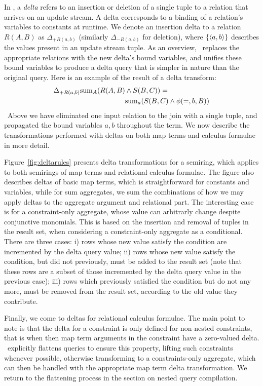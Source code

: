 In \compiler, a \textit{delta} refers to an insertion or deletion of a single
tuple to a relation that arrives on an update stream. A delta corresponds to a
binding of a relation's variables to constants at runtime. We denote an
insertion delta to a relation $R(A,B)$ as $\Delta_{+R(a,b)}$ (similarly
$\Delta_{-R(a,b)}$ for deletion), where $\{{\langle a,b\rangle}\}$ describes the values
present in an update stream tuple. As an overview, \compiler\ replaces the
appropriate relations with the new delta's bound variables, and unifies these
bound variables to produce a delta query that is simpler in nature than the
original query.
Here is an example of the result of a delta transform:
\begin{align*}
\Delta_{+R(a,b)} \mathrm{sum}_{A}(R(A,B) & \wedge S(B,C)) =\\
& \mathrm{sum}_{a}(S(B,C) \wedge \phi(=,b,B))
\end{align*}
\noindent~Above we have eliminated one input relation to the join
with a single tuple, and propagated the bound variables $a,b$ throughout the
term.  We now describe the transformations performed with deltas on both map
terms and calculus formulae in more detail.


Figure~\ref{fig:deltarules} presents delta transformations for a semiring, which
applies to both semirings of map terms and relational calculus formulae. The
figure also describes deltas of basic map terms, which is straightforward for
constants and variables, while for sum aggregates, we sum the combinations of
how we may apply deltas to the aggregate argument and relational part.
The interesting case is for a constraint-only aggregate, whose value can
arbitrarly change despite conjunctive monomials. This is based on the insertion
and removal of tuples in the result set, when considering a constraint-only
aggregate as a conditional. There are three cases:
i) rows whose new value satisfy the condition are
  incremented by the delta query value;
ii) rows whose new value satisfy the condition, but did not previously, must
  be added to the result set (note that these rows are a subset of those
  incremented by the delta query value in the previous case);
iii) rows which previously satisfied the condition but do not any more, must be
  removed from the result set, according to the old value they contribute.

Finally, we come to deltas for relational calculus formulae. The main point to
note is that the delta for a constraint is only defined for non-nested
constraints, that is when then map term arguments in the constraint have a
zero-valued delta. \compiler\ explicitly flattens queries to ensure this
property, lifting such constraints whenever possible, otherwise transforming to
a constraints-only aggregate, which can then be handled with the appropriate map
term delta transformation. We return to the flattening process in the section on
nested query compilation.


